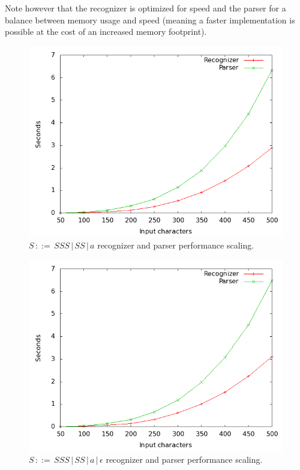 \documentclass[a4paper,10pt]{article}
\begin{document}
Note however that the recognizer is optimized for speed and the parser for a balance between memory usage and speed (meaning a faster implementation is possible at the cost of an increased memory footprint).

\begin{figure}[H]
\centering
\includegraphics[scale=0.4]{worst-case.png}
\caption{$S\,::=\,SSS\,|\,SS\,|\,a$ recognizer and parser performance scaling.}
\end{figure}

\begin{figure}[H]
\centering
\includegraphics[scale=0.4]{worst-case_with-epsilon.png}
\caption{$S\,::=\,SSS\,|\,SS\,|\,a\,|\,\epsilon$ recognizer and parser performance scaling.}
\end{figure}
\end{document}
